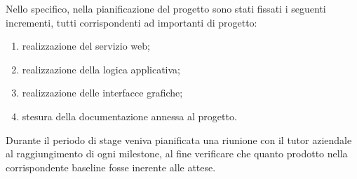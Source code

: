 Nello specifico, nella pianificazione del progetto sono stati fissati i seguenti incrementi, tutti corrispondenti ad importanti  di progetto:
\begin{enumerate}
	\item realizzazione del servizio web;
	\item realizzazione della logica applicativa;
	\item realizzazione delle interfacce grafiche;
	\item stesura della documentazione annessa al progetto.
\end{enumerate}

Durante il periodo di stage veniva pianificata una riunione con il tutor aziendale al raggiungimento di ogni milestone, al fine verificare che quanto prodotto nella corrispondente baseline fosse inerente alle attese.